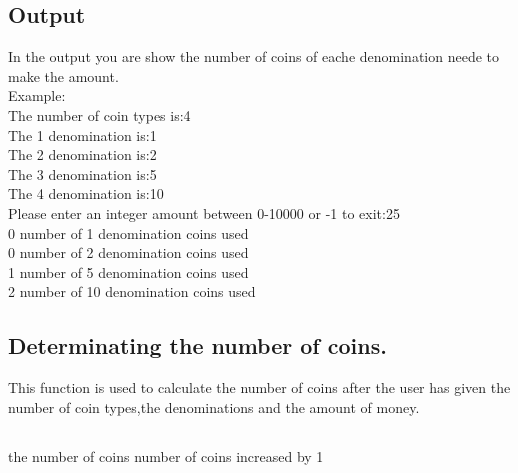 \documentclass{report}
\begin{document}
\subsection*{Output}
In the output you are show the number of coins of eache denomination neede to make the amount.
\\
Example:
\\
The number of coin types is:4
\\
The 1 denomination is:1
\\
The 2 denomination is:2
\\
The 3 denomination is:5
\\
The 4 denomination is:10
\\
Please enter an integer amount between 0-10000 or -1 to exit:25
\\
0 number of 1 denomination coins used
\\
0 number of 2 denomination coins used
\\
1 number of 5 denomination coins used
\\
2 number of 10 denomination coins used


\subsection*{Determinating the number of coins.}
This function is used to calculate the number of coins after the user has given the number of coin types,the denominations and the amount of money.
\subsection*{}

\begin{algorithm}[H]
     {
        \Return the number of coins\;
        }{
            {
                \Return number of coins increased by 1 \;
            }{
                }
        }
        
    \caption{Determinating the number of coins.}
\end{algorithm}
\end{document}

